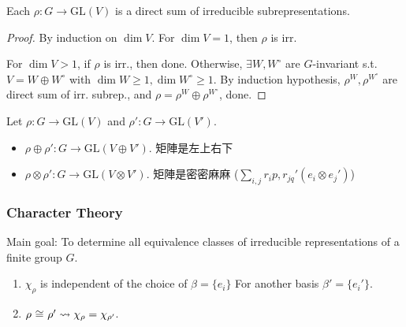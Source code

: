 \begin{theorem}
  Each $\rho: G\to \text{GL}(V)$ is a direct sum of irreducible
  subrepresentations.
  \begin{proof}
    By induction on $\dim V$. For $\dim V = 1$, then $\rho$ is irr.

    For $\dim V > 1$, if $\rho$ is irr., then done.
    Otherwise, $\exists W, W^\circ$ are $G$-invariant s.t.
    $V = W \oplus W^\circ$ with $\dim W \ge 1, \dim W^\circ \ge 1$.
    By induction hypothesis, $\rho^W, \rho^{W^\circ}$ are direct sum
    of irr. subrep., and $\rho = \rho^W \oplus \rho^{W^\circ}$, done.
  \end{proof}
\end{theorem}

\begin{remark}
  Let $\rho: G \to \text{GL}(V)$ and $\rho': G \to \text{GL}(V')$.
  \begin{itemize}
    \item $\rho \oplus \rho': G \to \text{GL}(V\oplus V')$.
      矩陣是左上右下
    \item $\rho \otimes \rho': G \to \text{GL}(V\otimes V')$.
      矩陣是密密麻麻 ($\sum_{i,j} r_ip, r_{jq}' (e_i \otimes e_j')$)
  \end{itemize}
\end{remark}

\subsubsection{Character Theory }

Main goal: To determine all equivalence classes of irreducible representations
of a finite group $G$.

\begin{definition}

\end{definition}

\begin{remark} \mbox{}
  \begin{enumerate}
    \item $\chi_\rho$ is independent of the choice of $\beta = \{ e_i \}$
      For another basis $\beta' = \{ e_i' \}$.
    \item $\rho \tikz[anchor=base, baseline]{ \node(rho-equiv) {$\cong$}; }
      \rho' \leadsto \chi_\rho = \chi_{\rho'}$.
  \end{enumerate}
\end{remark}

